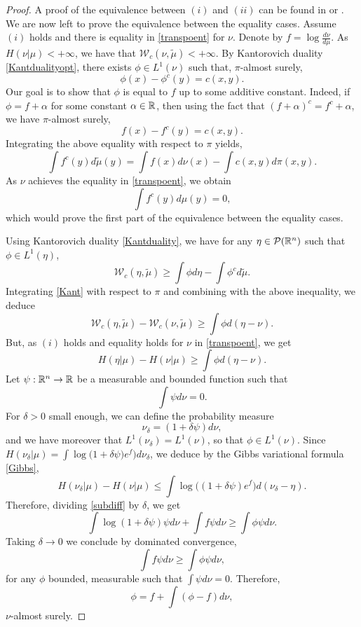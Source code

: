\documentclass[a4paper,oneside,11pt]{article}
\begin{document}
\begin{proof}
A proof of the equivalence between $(i)$ and $(ii)$ can be found in  \cite[Corollary 3.1]{GL} or \cite[Theorem 5.26]{Villani}. We are now left to prove the equivalence between the equality cases. Assume $(i)$ holds and there is equality in \eqref{transpoent} for $\nu$. Denote by $f = \log \frac{d \nu}{d\mu}$. As $H(\nu|\mu) < +\infty$, we have that $\mathcal{W}_c(\nu,\tilde \mu) < +\infty$. By Kantorovich duality \eqref{Kantdualityopt}, there exists $\phi \in L^1(\nu)$ such that, $\pi$-almost surely,
\begin{equation}\label{Kant} \phi(x) - \phi^c(y) = c(x,y).\end{equation}
Our goal is to show that $\phi$ is equal to $f$ up to some additive constant. Indeed, if $\phi = f +\alpha$ for some constant $\alpha\in \mathbb{R}$, then using the fact  that $(f+\alpha)^c = f^c +\alpha$, we have $\pi$-almost surely,
$$ f(x) -f^c(y) = c(x,y).$$
Integrating the above equality with respect to $\pi$ yields,
$$ \int f^c(y) d\tilde \mu(y) = \int f(x) d \nu(x) - \int c(x,y) d\pi(x,y).$$
As $\nu$ achieves the equality in \eqref{transpoent}, we obtain
$$ \int f^c(y) d\mu(y) = 0,$$
which would prove the first part of the equivalence between the equality cases.

Using Kantorovich duality \eqref{Kantduality}, we have for any $\eta \in \mathcal{P}(\mathbb{R}^n)$ such that $\phi \in L^1(\eta)$,
$$ \mathcal{W}_c(\eta,\tilde \mu) \geq \int \phi d\eta - \int \phi^c d\tilde \mu.$$
Integrating  \eqref{Kant} with respect to $\pi$ and combining with the above inequality, we deduce
$$ \mathcal{W}_c(\eta,\tilde \mu) - \mathcal{W}_c(\nu,\tilde \mu) \geq \int \phi d(\eta - \nu).$$
But, as $(i)$ holds and equality holds for $\nu$ in \eqref{transpoent}, we get
\begin{equation}\label{subdiff} H(\eta|\mu) - H(\nu|\mu) \geq  \int \phi d(\eta - \nu).\end{equation}
Let $\psi : \mathbb{R}^n \to\mathbb{R}$ be a measurable and bounded function such that 
$$ \int \psi d\nu =0.$$
For $\delta>0$ small enough, we can define the probability measure 
$$ \nu_\delta = (1+\delta \psi) d\nu,$$
and we have moreover that $L^1(\nu_\delta) = L^1(\nu)$, so that $\phi \in L^1(\nu)$. Since $H(\nu_{\delta} | \mu) = \int \log \big(1 + \delta \psi)e^f\big) d\nu_{\delta}$, we deduce by the Gibbs variational formula \eqref{Gibbs},
$$ H(\nu_\delta | \mu) - H(\nu | \mu) \leq  
 \int \log\big( (1 + \delta \psi)e^f\big) d(\nu_\delta  - \eta). $$
Therefore, dividing \eqref{subdiff} by $\delta$, we get
$$ \int \log (1+\delta \psi) \psi d\nu + \int f \psi d \nu \geq \int \phi \psi d\nu.$$
Taking $\delta \to 0$ we conclude by dominated convergence,
$$ \int f \psi d\nu \geq \int \phi \psi d\nu,$$
for any $\phi$ bounded, measurable such that $\int \psi d\nu =0$. Therefore,
$$ \phi = f + \int (\phi -f)d\nu,$$
$\nu$-almost surely. 



\end{proof}
\end{document}
